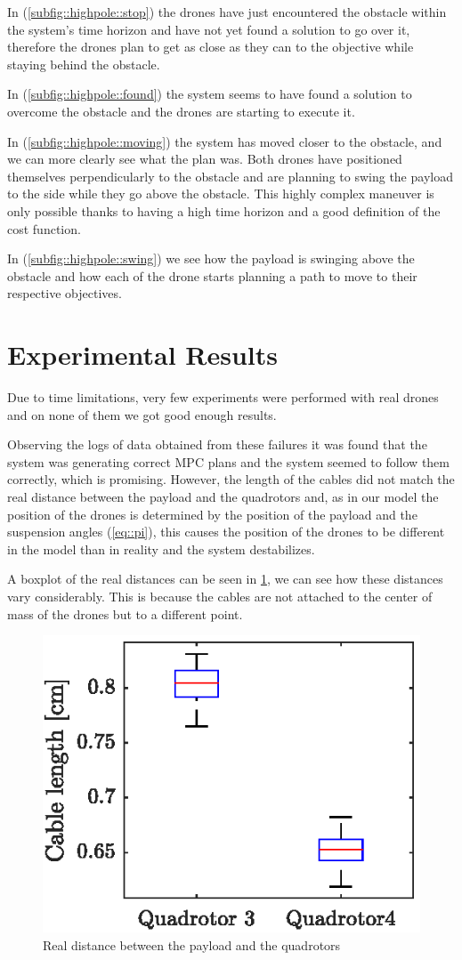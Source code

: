 \begin{figure}
\end{figure} 

In (\ref{subfig::highpole::stop}) the drones have just encountered the obstacle within the system's time horizon and have not yet found a solution to go over it, therefore the drones plan to get  as close as they can to the objective while staying behind the obstacle.

In (\ref{subfig::highpole::found}) the system seems to have found a solution to overcome the obstacle and the drones are starting to execute it.

In (\ref{subfig::highpole::moving}) the system has moved closer to the obstacle, and we can more clearly see what the plan was. Both drones have positioned themselves perpendicularly to the obstacle and are planning to swing the payload to the side while they go above the obstacle. This highly complex maneuver is only possible thanks to having a high time horizon and a good definition of the cost function.

In (\ref{subfig::highpole::swing}) we see how the payload is swinging above the obstacle and how each of the drone starts planning a path to move to their respective objectives.

\section{Experimental Results}
\label{sect::experimental}

Due to time limitations, very few experiments were performed with real drones and on none of them we got good enough results. 

Observing the logs of data obtained from these failures it was found that the system was generating correct \ac{MPC} plans and the system seemed to follow them correctly, which is promising. However, the length of the cables did not match the real distance between the payload and the quadrotors and, as in our model the position of the drones is determined by the position of the payload and the suspension angles (\cref{eq::pi}), this causes the position of the drones to be different in the model than in reality and the system destabilizes.

A boxplot of the real distances can be seen in \cref{fig::real_len}, we can see how these distances vary considerably. This is because the cables are not attached to the center of mass of the drones but to a different point. 

\begin{figure}
	\centering
	\includegraphics[width=.3\linewidth]{Figures/real_len}
	\caption{Real distance between the payload and the quadrotors} 
	\label{fig::real_len}
\end{figure}

